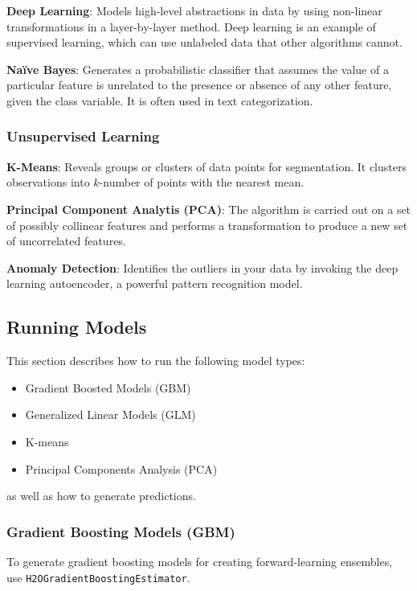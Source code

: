 {{\textbf{Deep Learning}}: Models high-level abstractions in data by using non-linear transformations in a layer-by-layer method. Deep learning is an example of supervised learning, which can use unlabeled data that other algorithms cannot.

{\textbf{Na\"{i}ve Bayes}}: Generates a probabilistic classifier that assumes the value of a particular feature is unrelated to the presence or absence of any other feature, given the class variable. It is often used in text categorization.

\subsubsection{Unsupervised Learning}
{\textbf{K-Means}}: Reveals groups or clusters of data points for segmentation. It clusters observations into $k$-number of points with the nearest mean.

{\textbf{Principal Component Analytis (PCA)}}: The algorithm is carried out on a set of possibly collinear features and performs a transformation to produce a new set of uncorrelated features.

{\textbf{Anomaly Detection}}: Identifies the outliers in your data by invoking the deep learning autoencoder, a powerful pattern recognition model.

\newpage

\subsection{Running Models}
This section describes how to run the following model types:

\begin{itemize}
\item Gradient Boosted Models (GBM)
\item Generalized Linear Models (GLM)
\item K-means
\item Principal Components Analysis (PCA)

\end{itemize}
as well as how to generate predictions.

\subsubsection{Gradient Boosting Models (GBM)}
To generate gradient boosting models for creating forward-learning ensembles,
use {\texttt{H2OGradientBoostingEstimator}}.  

}
